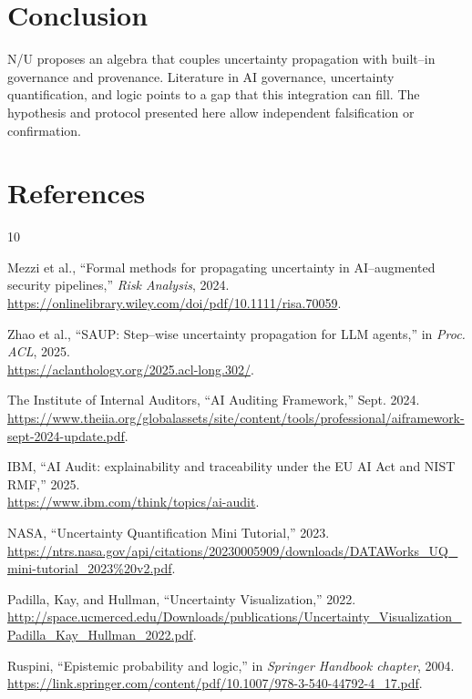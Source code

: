 \documentclass[11pt]{article}
\begin{document}
\section{Conclusion}
N/U proposes an algebra that couples uncertainty propagation with built--in governance and provenance. Literature in AI governance, uncertainty quantification, and logic points to a gap that this integration can fill. The hypothesis and protocol presented here allow independent falsification or confirmation.

\section*{References}
\begin{thebibliography}{10}

Mezzi et al., ``Formal methods for propagating uncertainty in AI--augmented security pipelines,'' \emph{Risk Analysis}, 2024. \\
\url{https://onlinelibrary.wiley.com/doi/pdf/10.1111/risa.70059}.

Zhao et al., ``SAUP: Step--wise uncertainty propagation for LLM agents,'' in \emph{Proc. ACL}, 2025. \\
\url{https://aclanthology.org/2025.acl-long.302/}.

The Institute of Internal Auditors, ``AI Auditing Framework,'' Sept. 2024. \\
\url{https://www.theiia.org/globalassets/site/content/tools/professional/aiframework-sept-2024-update.pdf}.

IBM, ``AI Audit: explainability and traceability under the EU AI Act and NIST RMF,'' 2025. \\
\url{https://www.ibm.com/think/topics/ai-audit}.

NASA, ``Uncertainty Quantification Mini Tutorial,'' 2023. \\
\url{https://ntrs.nasa.gov/api/citations/20230005909/downloads/DATAWorks_UQ_mini-tutorial_2023%20v2.pdf}.

Padilla, Kay, and Hullman, ``Uncertainty Visualization,'' 2022. \\
\url{http://space.ucmerced.edu/Downloads/publications/Uncertainty_Visualization_Padilla_Kay_Hullman_2022.pdf}.

Ruspini, ``Epistemic probability and logic,'' in \emph{Springer Handbook chapter}, 2004. \\
\url{https://link.springer.com/content/pdf/10.1007/978-3-540-44792-4_17.pdf}.


\end{thebibliography}
\end{document}
